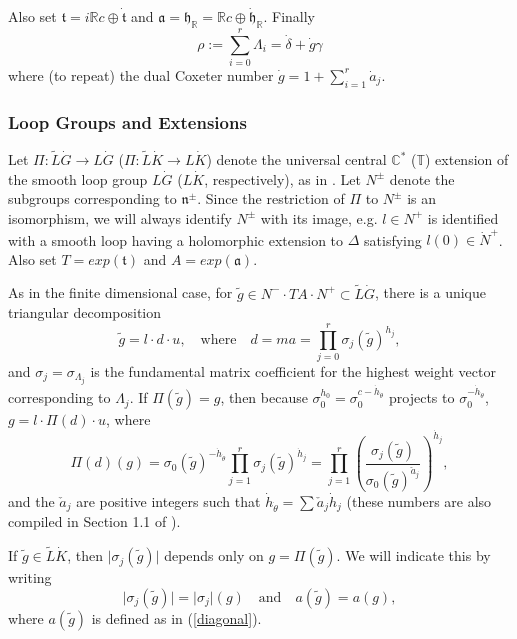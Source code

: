 \documentclass{amsart}
\theoremstyle{conjecture}
\theoremstyle{definition}
\theoremstyle{question}
\theoremstyle{questions}
\theoremstyle{remark}
\theoremstyle{remarks}
\theoremstyle{example}
\numberwithin{equation}{section}
\begin{document}
Also set $\mathfrak t=i\mathbb R c \oplus \dot{\mathfrak t}$ and
$\mathfrak a=\mathfrak h_{\mathbb R}=\mathbb R c \oplus
\dot{\mathfrak h}_{\mathbb R}$. Finally
\begin{equation}
\rho:=\sum_{i=0}^r\Lambda_i=\dot {\delta}+\dot g \gamma
\end{equation}
where (to repeat) the dual Coxeter number $\dot g=1+\sum_{i=1}^r\dot a_j$.

\subsubsection{Loop Groups and Extensions}\label{loopgroups}


Let $\Pi:\tilde L \dot G \to L \dot G$ ($\Pi:\tilde L \dot K \to L
\dot K$) denote the universal central $\mathbb C^*$ ($\mathbb T$)
extension of the smooth loop group $L \dot G$ ($L \dot K$,
respectively), as in \cite{PS}. Let $N^{\pm}$ denote the subgroups
corresponding to $\mathfrak n^{\pm}$. Since the restriction of
$\Pi$ to $N^{\pm}$ is an isomorphism, we will always identify
$N^{\pm}$ with its image, e.g. $l\in N^+$ is identified with a
smooth loop having a holomorphic extension to $\Delta$ satisfying
$l(0)\in \dot N^+$. Also set $T=exp(\mathfrak t)$ and
$A=exp(\mathfrak a)$.

As in the finite dimensional case, for $\tilde {g}\in N^{-}\cdot T
A\cdot N^{+}\subset\tilde {L}\dot G$, there is a unique triangular
decomposition
\begin{equation}\label{diagonal}\tilde {g}=l\cdot d \cdot u,\quad \text{where}\quad d
=ma=\prod_{j=0}^r\sigma_j(\tilde { g})^{h_j},\end{equation} and
$\sigma_j=\sigma_{\Lambda_j}$ is the fundamental matrix
coefficient for the highest weight vector corresponding to
$\Lambda_j$. If $\Pi(\tilde {g})=g$, then because
$\sigma_0^{h_0}=\sigma_0^{c-\dot {h}_{\dot{\theta}}}$ projects to
$\sigma_ 0^{-\dot {h}_{\dot{\theta}}}$, $g=l\cdot \Pi(d)\cdot u$,
where
\begin{equation}\label{loopdiagonal}\Pi(d)(g)=
\sigma_0(\tilde {g})^{-\dot
{h}_{\dot{\theta}}}\prod_{j=1}^r\sigma_j(\tilde {g})^{\dot
{h}_j}=\prod_{j=1}^r\left (\frac {\sigma_j(\tilde
{g})}{\sigma_0(\tilde {g})^{\check {a}_j}}\right )^{\dot {h}_j},
\end{equation} and the $\check {a}_j$ are positive integers such
that $\dot {h}_{\dot{\theta}}=\sum\check {a}_j\dot {h}_j$ (these
numbers are also compiled in Section 1.1 of \cite{KW}).

If $\tilde{g} \in \tilde{L}\dot K$, then
$\vert\sigma_j(\tilde{g})\vert$ depends only on $g=\Pi(\tilde g)$.
We will indicate this by writing
\begin{equation}\label{diagonalnotation}\vert\sigma_j(\tilde{g})\vert=\vert\sigma_j\vert(g)
\quad \text{and} \quad a(\tilde g)=a(g),\end{equation} where
$a(\tilde g)$ is defined as in (\ref{diagonal}).
\end{document}
